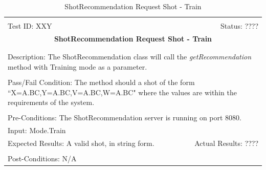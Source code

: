 \documentclass[11pt]{article}
\begin{document}
\begin{center}
\begin{table}[H]
\begin{tabular}{|l r|}\hline&\\[-2mm]
	Test ID: XXY	&Status: ????\\[-3mm]
	\multicolumn{2}{|c|}{\textbf{\large{ShotRecommendation Request Shot - Train}}}\\&\\\hline&\\[-3mm]
	\multicolumn{2}{|p{\textwidth}|}{Description: The ShotRecommendation class will call the \textit{getRecommendation} method with Training mode as a parameter.}\\[1mm]\hline&\\[-3mm]
	\multicolumn{2}{|p{\textwidth}|}{Pass/Fail Condition: The method should a shot of the form ``X=A.BC,Y=A.BC,V=A.BC,W=A.BC" where the values are within the requirements of the system.}\\[1mm]\hline&\\[-3mm]
	\multicolumn{2}{|p{\textwidth}|}{Pre-Conditions: The ShotRecommendation server is running on port 8080.}\\[4mm]
	\multicolumn{2}{|p{\textwidth}|}{Input: Mode.Train}\\[2mm]\hline
	\multicolumn{1}{|p{0.49\textwidth}}{Expected Results: A valid shot, in string form.}	&\multicolumn{1}{|p{0.45\textwidth}|}{Actual Results: ????}\\\hline&\\[-3mm]
	\multicolumn{2}{|p{\textwidth}|}{Post-Conditions: N/A}\\\hline
\end{tabular}
\caption{ShotRecommendation Request Shot - Train}
\end{table}
\end{center}
\end{document}
